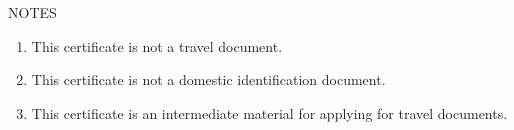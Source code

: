 \documentclass[b6paper,10pt]{article}
\begin{document}
        \begin{tcolorbox}[standard jigsaw,height=117mm,width=82mm,left=2mm,right=2mm,nobeforeafter,colframe=NavyBlue,colback=white,boxrule=0.5pt]
            \begin{minipage}[t][110mm][t]{74mm}%
                \raggedright

                NOTES

                \begin{enumerate}[noitemsep,leftmargin=15pt]
                    \item This certificate is not a travel document.
                    \item This certificate is not a domestic identification document.
                    \item This certificate is an intermediate material for applying for travel documents.
                \end{enumerate}

            \end{minipage}%
        \end{tcolorbox}%
\end{document}
